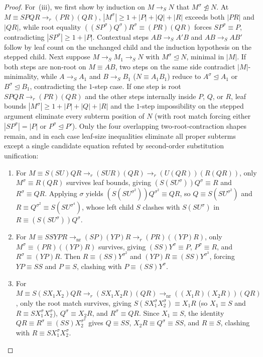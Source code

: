 \documentclass[11pt,reqno]{amsart}
\numberwithin{equation}{section}
\theoremstyle{plain}
\theoremstyle{definition}
\theoremstyle{remark}
\newcommand{\redS}{\to_S}
\begin{document}
\begin{proof}
For~(iii), we first show by induction on $M \redS N$ that $M^\sigma \not\trianglelefteq N$. At $M \equiv S P Q R \to_r (P R)(Q R)$, $|M^\sigma| \ge 1 + |P| + |Q| + |R|$ exceeds both $|P R|$ and $|Q R|$, while root equality $((S P^\sigma) Q^\sigma) R^\sigma \equiv (P R)(Q R)$ forces $S P^\sigma \equiv P$, contradicting $|S P^\sigma| \ge 1 + |P|$. Contextual steps $A B \redS A' B$ and $A B \redS A B'$ follow by leaf count on the unchanged child and the induction hypothesis on the stepped child. Next suppose $M \redS M_1 \redS N$ with $M^\sigma \trianglelefteq N$, minimal in $|M|$. If both steps are non-root on $M \equiv A B$, two steps on the same side contradict $|M|$-minimality, while $A \redS A_1$ and $B \redS B_1$ ($N \equiv A_1 B_1$) reduce to $A^\sigma \trianglelefteq A_1$ or $B^\sigma \trianglelefteq B_1$, contradicting the $1$-step case. If one step is root $S P Q R \to_r (P R)(Q R)$ and the other steps internally inside $P$, $Q$, or $R$, leaf bounds $|M^\sigma| \ge 1 + |P| + |Q| + |R|$ and the $1$-step impossibility on the stepped argument eliminate every subterm position of $N$ (with root match forcing either $|S P^\sigma| = |P|$ or $P^\sigma \trianglelefteq P'$). Only the four overlapping two-root-contraction shapes remain, and in each case leaf-size inequalities eliminate all proper subterms except a single candidate equation refuted by second-order substitution unification:
\begin{enumerate}[label=(\arabic*),leftmargin=2.2em]
  \item For $M \equiv S(S U) Q R \to_r (S U R)(Q R) \to_r (U(Q R))(R(Q R))$, only $M^\sigma \equiv R(Q R)$ survives leaf bounds, giving $(S(S U^\sigma)) Q^\sigma \equiv R$ and $R^\sigma \equiv Q R$. Applying $\sigma$ yields $(S(S U^{\sigma^2})) Q^{\sigma^2} \equiv Q R$, so $Q \equiv S(S U^{\sigma^2})$ and $R \equiv Q^{\sigma^2} \equiv S(S U^{\sigma^4})$, whose left child $S$ clashes with $S(S U^\sigma)$ in $R \equiv (S(S U^\sigma)) Q^\sigma$.
  \item For $M \equiv S S Y P R \to_{\mathrm{nr}} (S P)(Y P) R \to_r (P R)((Y P) R)$, only $M^\sigma \equiv (P R)((Y P) R)$ survives, giving $(S S) Y^\sigma \equiv P$, $P^\sigma \equiv R$, and $R^\sigma \equiv (Y P) R$. Then $R \equiv (S S) Y^{\sigma^2}$ and $(Y P) R \equiv (S S) Y^{\sigma^3}$, forcing $Y P \equiv S S$ and $P \equiv S$, clashing with $P \equiv (S S) Y^\sigma$.
  \item For $M \equiv S(S X_1 X_2) Q R \to_r (S X_1 X_2 R)(Q R) \to_{\mathrm{nr}} ((X_1 R)(X_2 R))(Q R)$, only the root match survives, giving $S(S X_1^\sigma X_2^\sigma) \equiv X_1 R$ (so $X_1 \equiv S$ and $R \equiv S X_1^\sigma X_2^\sigma$), $Q^\sigma \equiv X_2 R$, and $R^\sigma \equiv Q R$. Since $X_1 \equiv S$, the identity $Q R \equiv R^\sigma \equiv (S S) X_2^{\sigma^2}$ gives $Q \equiv S S$, $X_2 R \equiv Q^\sigma \equiv S S$, and $R \equiv S$, clashing with $R \equiv S X_1^\sigma X_2^\sigma$.

\end{enumerate}
\end{proof}
\end{document}
